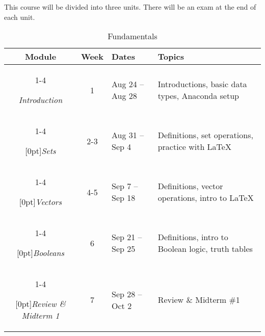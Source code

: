 \documentclass[10pt]{memoir}
\begin{document}
This course will be divided into three units. There will be an exam at the end of each unit. \\

\begin{table}[htb!]
\centering
\begin{tabular}{ccll}
    \toprule[.15em]
    \textbf{Module} & \textbf{Week} & \textbf{Dates} & \textbf{Topics} \\
    \cmidrule[.1em](lr){1-4}
    
    \textit{Introduction} & 1 & Aug 24 -- Aug 28 & Introductions, basic data types, Anaconda setup \\
    \cmidrule[.1em](lr){1-4} 
 
     \multirow{1}{*}[0pt]{\textit{Sets}} %
        & 2-3 & Aug 31 -- Sep 4 & Definitions, set operations, practice with \LaTeX \\ 
        \cmidrule[.1em](lr){1-4}
        
    \multirow{1}{*}[0pt]{\textit{Vectors}} %
        & 4-5 & Sep 7 -- Sep 18 & Definitions, vector operations, intro to  \LaTeX  \\ \cmidrule[.1em](lr){1-4}

    \multirow{1}{*}[0pt]{\textit{Booleans}} %
        & 6 & Sep 21 -- Sep 25 & Definitions, intro to Boolean logic, truth tables \\   \cmidrule[.1em](lr){1-4}    

   \multirow{1}{*}[0pt]{\textit{Review \& Midterm 1}} %
        & 7 & Sep 28 -- Oct 2 & Review \& Midterm \#1 \\         
      
    \bottomrule[.15em]
\end{tabular}\\
\caption{Fundamentals}
\end{table}

\end{document}
